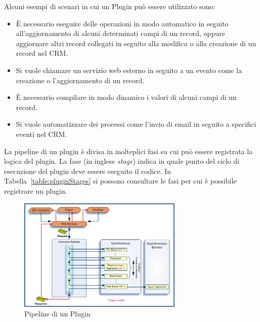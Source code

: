 Alcuni esempi di scenari in cui un Plugin può essere utilizzato sono:
\begin{itemize}
  \item È necessario eseguire delle operazioni in modo automatico in seguito all'aggiornamento di alcuni determinati campi di un record, oppure aggiornare altri record collegati in seguito alla modifica o alla creazione di un record nel CRM.
  \item Si vuole chiamare un servizio web esterno in seguito a un evento come la creazione o l'aggiornamento di un record.
  \item È necessario compilare in modo dinamico i valori di alcuni campi di un record.
  \item Si vuole automatizzare dei processi come l'invio di email in seguito a specifici eventi nel CRM.
\end{itemize}

La pipeline di un plugin è divisa in molteplici fasi su cui può essere registrata la logica del plugin. La fase (in inglese \textit{stage}) indica in quale punto del ciclo di esecuzione del plugin deve essere eseguito il codice. In Tabella~\ref{table:pluginStages} si possono consultare le fasi per cui è possibile registrare un plugin.  

\begin{figure}[ht]
  \centering
  \includegraphics[width=0.7\textwidth]{plugin-pipeline.png}
  \caption{Pipeline di un Plugin}
  \label{fig:pluginPipeline}
\end{figure}

